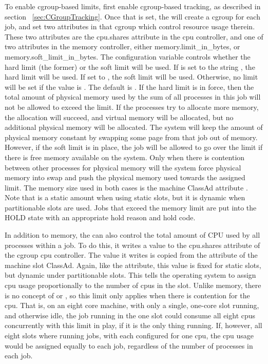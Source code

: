 To enable cgroup-based limits, first enable cgroup-based tracking, as
described in section ~\ref{sec:CGroupTracking}.  
Once that is set,
the  will create a cgroup for each job, and set two
attributes in that cgroup which control resource usage therein.  
These
two attributes are the cpu.shares attribute in the cpu controller, and one
of two attributes in the memory controller, either memory.limit\_in\_bytes, or 
memory.soft\_limit\_in\_bytes.  
The configuration variable  controls
whether the hard limit (the former) or the soft limit will be used.  
If  is set to the string , 
the hard limit will be used.
If set to , the soft limit will be used.  
Otherwise, no limit will be set if the value is .
The default is .
If the hard limit is in force, then the total amount of physical memory
used by the sum of all processes in this job will not be allowed to exceed
the limit.  
If the processes try to allocate more memory, the allocation will
succeed, and virtual memory will be allocated, 
but no additional physical memory will be allocated.
The system will keep the amount of physical memory constant by swapping some
page from that job out of memory.  
However, if the soft limit is in place,
the job will be allowed to go over the limit if there is free memory 
available on the system.  
Only when there is contention between other processes for physical memory
will the system force physical memory into swap and push
the physical memory used towards the assigned limit.
The memory size used in both cases is the machine ClassAd attribute
.
Note that  is 
a static amount when using static slots, but it is dynamic when partitionable 
slots are used.
Jobs that exceed the memory limit are put into the HOLD state with an
appropriate hold reason and hold code.

In addition to memory, the  can also control 
the total amount of CPU used by all processes within a job.
To do this, it writes a value
to the cpu.shares attribute of the cgroup cpu controller.  
The value it writes is copied from the  attribute 
of the machine slot ClassAd.
Again, like the  attribute, this value is fixed for static slots,
but dynamic under partitionable slots.  
This tells the operating system
to assign cpu usage proportionally to the number of cpus in the slot.  
Unlike memory, 
there is no concept of  or , 
so this limit only applies when there is contention for the cpu.
That is, on an eight core machine, with
only a single, one-core slot running, and otherwise idle, the job running
in the one slot could consume all eight cpus concurrently with this limit
in play, if it is the only thing running.  
If, however, all eight slots where running jobs, 
with each configured for one cpu, the cpu usage would be assigned
equally to each job, regardless of the number of processes in each job.

